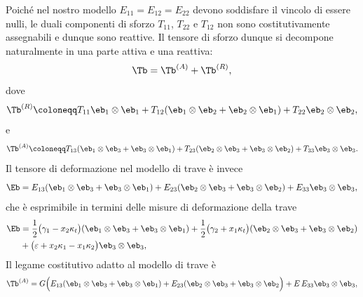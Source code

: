	Poiché nel nostro modello $E_{11}=E_{12}=E_{22}$ devono soddisfare il vincolo di essere nulli, le duali componenti di sforzo $T_{11}$, $T_{22}$ e $T_{12}$ non sono costitutivamente assegnabili e dunque sono reattive. Il tensore di sforzo dunque si decompone naturalmente in una parte attiva e una reattiva:
	\begin{equation}
	\Tb =\Tb^{(A)}+\Tb^{(R)},
	\end{equation}
dove 
\begin{equation}
\Tb^{(R)}\coloneqq T_{11}\eb_1\otimes\eb_{1}+T_{12}(\eb_1\otimes\eb_{2}+\eb_2\otimes \eb_1)+T_{22}\eb_2\otimes\eb_{2},
\end{equation}
e
\begin{equation}
\Tb^{(A)}\coloneqq T_{13}(\eb_{1}\otimes \eb_3+\eb_{3}\otimes \eb_1)+T_{23}(\eb_{2}\otimes \eb_3+\eb_{3}\otimes \eb_2)+T_{33}\eb_3\otimes\eb_3. %
\end{equation}
Il tensore di deformazione nel modello di trave è invece
\begin{equation}
\Eb= E_{13}(\eb_{1}\otimes \eb_3+\eb_{3}\otimes \eb_1)+E_{23}(\eb_{2}\otimes \eb_3+\eb_{3}\otimes \eb_2)+E_{33}\eb_3\otimes\eb_3,
\end{equation}
che è esprimibile in termini delle misure di deformazione della trave
\begin{equation}\label{Eb1D}
	\begin{aligned}
		\Eb&=\frac{1}{2}\big(\gamma_1-x_2\kappa_t \big)(\eb_1\otimes\eb_3+\eb_3\otimes\eb_1)+\frac{1}{2}\big(\gamma_2+x_1\kappa_t \big)(\eb_2\otimes\eb_3+\eb_3\otimes\eb_2)\\
		&+\big(\varepsilon+x_2\kappa_1-x_1\kappa_2\big)\eb_3\otimes\eb_3,
	\end{aligned}
\end{equation}
Il legame costitutivo  adatto al modello di trave è 
\begin{equation}\label{eqcosttrav}
\Tb^{(A)}=G\Big(  E_{13}(\eb_{1}\otimes \eb_3+\eb_{3}\otimes \eb_1)+E_{23}(\eb_{2}\otimes \eb_3+\eb_{3}\otimes \eb_2 \Big)+ E \,E_{33}\eb_3\otimes\eb_3,
\end{equation}
